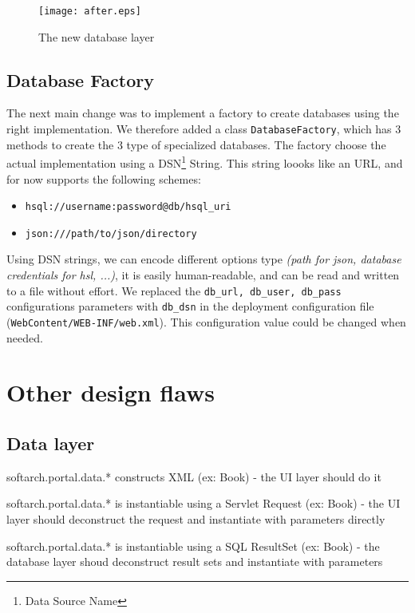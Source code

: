 \begin{figure}[!h]
  \texttt{[image: after.eps]}
  \caption{The new database layer}
\end{figure}

\subsection{Database Factory}
The next main change was to implement a factory to create databases using the
right implementation. We therefore added a class \texttt{DatabaseFactory}, which
has 3 methods to create the 3 type of specialized databases. The factory choose
the actual implementation using a DSN\footnote{Data Source Name} String. This string
loooks like an URL, and for now supports the following schemes:
\begin{itemize}
  \item \texttt{hsql://username:password@db/hsql\_uri}
  \item \texttt{json:///path/to/json/directory}
\end{itemize}

Using DSN strings, we can encode different options type \textit{(path for json, database credentials for hsl, ...)}, it is easily human-readable, and can be read and written to a file without effort. We replaced the \texttt{db\_url, db\_user, db\_pass} configurations parameters with \texttt{db\_dsn} in the deployment configuration file (\texttt{WebContent/WEB-INF/web.xml}). This configuration value could be changed when needed.


\section{Other design flaws}

\subsection{Data layer}

softarch.portal.data.* constructs XML (ex: Book) - the UI layer should do it

softarch.portal.data.* is instantiable using a Servlet Request (ex: Book) - the UI layer should deconstruct the request and instantiate with parameters directly

softarch.portal.data.* is instantiable using a SQL ResultSet (ex: Book) - the database layer shoud deconstruct result sets and instantiate with parameters

